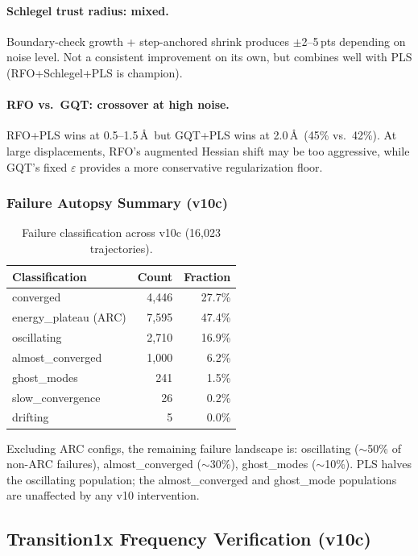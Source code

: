\documentclass[11pt,a4paper]{article}
\theoremstyle{definition}
\begin{document}
\paragraph{Schlegel trust radius: mixed.}
Boundary-check growth + step-anchored shrink produces $\pm$2--5\,pts
depending on noise level.  Not a consistent improvement on its own,
but combines well with PLS (RFO+Schlegel+PLS is champion).

\paragraph{RFO vs.\ GQT: crossover at high noise.}
RFO+PLS wins at 0.5--1.5\,\AA\ but GQT+PLS wins at 2.0\,\AA\ (45\%
vs.\ 42\%).  At large displacements, RFO's augmented Hessian shift may
be too aggressive, while GQT's fixed $\varepsilon$ provides a more
conservative regularization floor.

\subsubsection{Failure Autopsy Summary (v10c)}

\begin{table}[h]
\centering
\caption{Failure classification across v10c (16,023 trajectories).}
\label{tab:autopsy-v10c}
\begin{tabular}{lrr}
\toprule
Classification & Count & Fraction \\
\midrule
converged & 4,446 & 27.7\% \\
energy\_plateau (ARC) & 7,595 & 47.4\% \\
oscillating & 2,710 & 16.9\% \\
almost\_converged & 1,000 & 6.2\% \\
ghost\_modes & 241 & 1.5\% \\
slow\_convergence & 26 & 0.2\% \\
drifting & 5 & 0.0\% \\
\bottomrule
\end{tabular}
\end{table}

Excluding ARC configs, the remaining failure landscape is:
oscillating ($\sim$50\% of non-ARC failures),
almost\_converged ($\sim$30\%),
ghost\_modes ($\sim$10\%).
PLS halves the oscillating population; the almost\_converged and
ghost\_mode populations are unaffected by any v10 intervention.

\subsection{Transition1x Frequency Verification (v10c)}
\label{sec:transition1x-verification}
\end{document}
